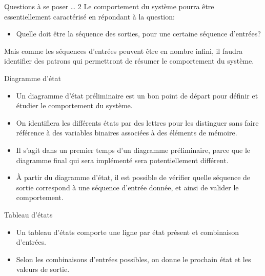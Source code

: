 \documentclass[presentation]{beamer}
\begin{document}
\begin{frame}[label={sec:org4a1b148}]{Questions à se poser \ldots{} 2}
Le comportement du système pourra être essentiellement caractérisé en répondant à la question:

\begin{itemize}
\item Quelle doit être la séquence des sorties, pour une certaine séquence d'entrées?
\end{itemize}

Mais comme les séquences d'entrées peuvent être en nombre infini, il faudra identifier des patrons qui permettront de résumer le comportement du système.
\end{frame}

\begin{frame}[label={sec:org6e37f03}]{Diagramme d'état}
\begin{itemize}
\item Un diagramme d'état préliminaire est un bon point de départ pour définir et étudier le comportement du système.

\item On identifiera les différents états par des lettres pour les distinguer sans faire référence à des variables binaires associées à des éléments de mémoire.

\item Il s'agit dans un premier temps d'un diagramme préliminaire, parce que le diagramme final qui sera implémenté sera potentiellement différent.

\item À partir du diagramme d'état, il est possible de vérifier quelle séquence de sortie correspond à une séquence d'entrée donnée, et ainsi de valider le comportement.
\end{itemize}
\end{frame}

\begin{frame}[label={sec:org05f7657}]{Tableau d'états}
\begin{itemize}
\item Un tableau d'états comporte une ligne par état présent et combinaison d'entrées.

\item Selon les combinaisons d'entrées possibles, on donne le prochain état et les valeurs de sortie.
\end{itemize}
\end{frame}
\end{document}

